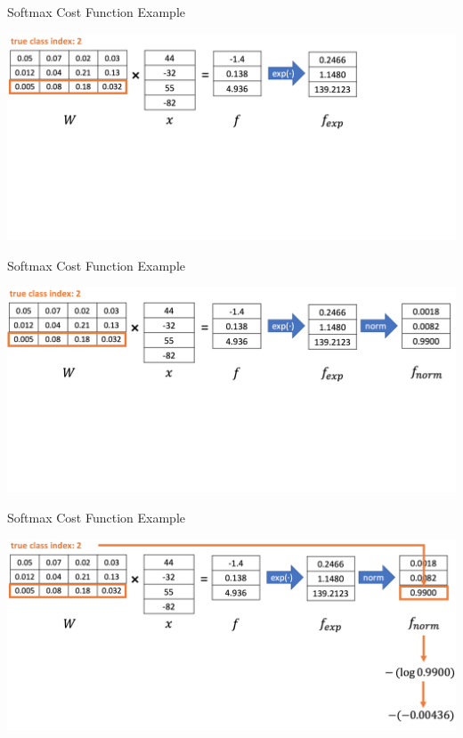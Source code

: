 \documentclass{beamer}
\begin{document}
\begin{frame}{Softmax Cost Function Example}
\begin{center}
\includegraphics[width=1.05\textwidth]{softmax_example4}
\end{center}
\end{frame}


\begin{frame}{Softmax Cost Function Example}
\begin{center}
\includegraphics[width=1.05\textwidth]{softmax_example5}
\end{center}
\end{frame}

\begin{frame}{Softmax Cost Function Example}
\begin{center}
\includegraphics[width=1.05\textwidth]{softmax_example6}
\end{center}
\end{frame}
\end{document}
